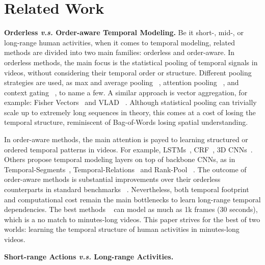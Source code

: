 \documentclass[10pt,twocolumn,letterpaper]{article}
\newcommand{\partitle}[1]{\noindent\textbf{#1}}
\newcommand{\ptspace}{\vspace*{5pt}}
\begin{document}
\section{Related Work}\label{sec:related_work}
\ptspace
\partitle{Orderless \textit{v.s.} Order-aware Temporal Modeling.}
Be it short-, mid-, or long-range human activities, when it comes to temporal modeling, related methods are divided into two main families: orderless and order-aware.
In orderless methods, the main focus is the statistical pooling of temporal signals in videos, without considering their temporal order or structure.
Different pooling strategies are used, as max and average pooling ~\cite{hussein2017unified}, attention pooling ~\cite{girdhar2017attentional}, and context gating ~\cite{miech2017learnable}, to name a few.
A similar approach is vector aggregation, for example: Fisher Vectors~\cite{oneata2013action} and VLAD ~\cite{duta2017spatio, girdhar2017actionvlad}.
Although statistical pooling can trivially scale up to extremely long sequences in theory, this comes at a cost of losing the temporal structure, reminiscent of Bag-of-Words losing spatial understanding.

In order-aware methods, the main attention is payed to learning structured or ordered temporal patterns in videos.
For example, LSTMs~\cite{li2017concurrent, donahue2015long}, CRF~\cite{sigurdsson2017asynchronous}, 3D CNNs~\cite{xu2017r, carreira2017quo, tran2018closer, xie2017rethinking, wang2017non}.
Others propose temporal modeling layers on top of backbone CNNs, as in Temporal-Segments~\cite{wang2016temporal}, Temporal-Relations~\cite{zhou2017temporal} and Rank-Pool ~\cite{fernando2017rank}.
The outcome of order-aware methods is substantial improvements over their orderless counterparts in standard benchmarks ~\cite{kay2017kinetics, kuehne2011hmdb, soomro2012ucf101}.
Nevertheless, both temporal footprint and computational cost remain the main bottlenecks to learn long-range temporal dependencies.
The best methods ~\cite{hussein2018timeception, wang2017non} can model as much as 1k frames (30 seconds), which is a no match to minutes-long videos.
This paper strives for the best of two worlds: learning the temporal structure of human activities in minutes-long videos.

\ptspace
\partitle{Short-range Actions \textit{v.s.} Long-range Activities.}
\end{document}
